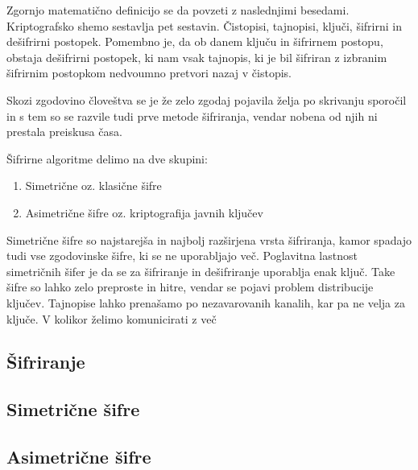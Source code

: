 \documentclass[12pt,a4paper,openany]{book}
\begin{document}
Zgornjo matematično definicijo se da povzeti z naslednjimi besedami. Kriptografsko shemo sestavlja pet sestavin. Čistopisi, tajnopisi, ključi, šifrirni in dešifrirni postopek. Pomembno je, da ob danem ključu in šifrirnem postopu, obstaja dešifrirni postopek, ki nam vsak tajnopis, ki je bil šifriran z izbranim šifrirnim postopkom nedvoumno pretvori nazaj v čistopis.

Skozi zgodovino človeštva se je že zelo zgodaj pojavila želja po skrivanju sporočil in s tem so se razvile tudi prve metode šifriranja, vendar nobena od njih ni prestala preiskusa časa.

Šifrirne algoritme delimo na dve skupini:
\begin{enumerate}

	\item Simetrične oz. klasične šifre
	\item Asimetrične šifre oz. kriptografija javnih ključev

\end{enumerate}

Simetrične šifre so najstarejša in najbolj razširjena vrsta šifriranja, kamor spadajo tudi vse zgodovinske šifre, ki se ne uporabljajo več. Poglavitna lastnost simetričnih šifer je da se za šifriranje in dešifriranje uporablja enak ključ. Take šifre so lahko zelo preproste in hitre, vendar se pojavi problem distribucije ključev. Tajnopise lahko prenašamo po nezavarovanih kanalih, kar pa ne velja za ključe. V kolikor želimo komunicirati z več

\subsection{Šifriranje}

\subsection{Simetrične šifre}

\subsection{Asimetrične šifre}

\newpage


\listoffigures

\newpage

\listoftables




\newpage


\label{stran_literatura}
 
\end{document}
